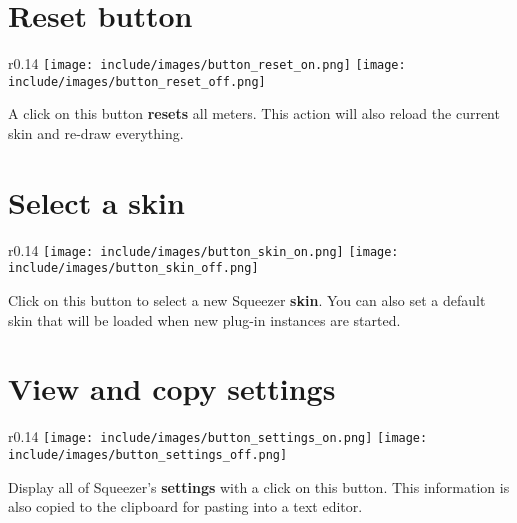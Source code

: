 \section{Reset button}

\begin{wrapfigure}{r}{0.14\linewidth}
  \texttt{[image: include/images/button\_reset\_on.png]}
  \newline \vspace{-0.9\baselineskip}
  \texttt{[image: include/images/button\_reset\_off.png]}
\end{wrapfigure}

A click on this button \textbf{resets} all meters.  This action will
also reload the current skin and re-draw everything.

\section{Select a skin}

\begin{wrapfigure}{r}{0.14\linewidth}
  \texttt{[image: include/images/button\_skin\_on.png]}
  \newline \vspace{-0.9\baselineskip}
  \texttt{[image: include/images/button\_skin\_off.png]}
\end{wrapfigure}

Click on this button to select a new Squeezer \textbf{skin}.  You can
also set a default skin that will be loaded when new plug-in instances
are started.

\newpage %

\section{View and copy settings}

\begin{wrapfigure}{r}{0.14\linewidth}
  \texttt{[image: include/images/button\_settings\_on.png]}
  \newline \vspace{-0.9\baselineskip}
  \texttt{[image: include/images/button\_settings\_off.png]}
\end{wrapfigure}

Display all of Squeezer's \textbf{settings} with a click on this
button.  This information is also copied to the clipboard for pasting
into a text editor.

